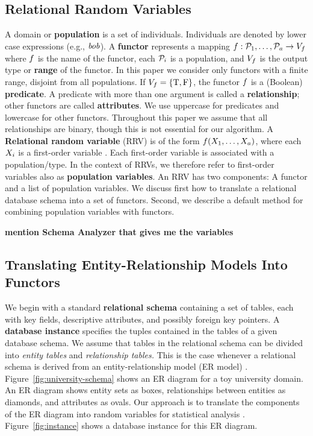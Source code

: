\documentclass{acm_proc_article-sp}
\begin{document}
\subsection{Relational Random Variables}
A domain or \textbf{population} is a set of individuals.
Individuals are denoted by lower case expressions (e.g., $\it{bob}$). 
A \textbf{functor} represents a mapping
$f: \mathcal{P}_{1},\ldots,\mathcal{P}_{a} \rightarrow V_{f}$
where $f$ is the name of the functor, each $\mathcal{P}_{i}$ is a population, and $V_{f}$ is the output type or \textbf{range} of the functor. 
In this paper we consider only functors with a finite range, disjoint from all populations.  If $V_{f} = \{\mathrm{T},\mathrm{F}\}$, the functor $f$ is a (Boolean) \textbf{predicate}. A predicate with more than one argument is called a \textbf{relationship}; other functors are called \textbf{attributes}. We use uppercase for predicates and lowercase for other functors. Throughout this paper we assume that all relationships are binary, though this is not essential for our algorithm.
%
A \textbf{Relational random variable} (RRV) is of the form $f(X_{1},\ldots,X_{a})$, where each $X_{i}$ is a first-order variable \cite{Poole2003}. 
Each first-order variable is associated with a population/type. In the context of RRVs, we therefore refer to first-order variables also as \textbf{population variables}. An RRV has two components: A functor and a list of population variables. We discuss first how to translate a relational database schema into a set of functors. Second, we describe a default method for combining population variables with functors. 

\textbf{mention Schema Analyzer that gives me the variables}

\subsection{Translating Entity-Relationship Models Into Functors}
 We begin with a standard \textbf{relational schema} containing a set of tables, each with key fields, %
descriptive attributes, and possibly foreign key pointers. 
A \textbf{database instance} specifies the tuples contained in the tables of a given database schema. 
We assume that tables in the relational schema can be divided into {\em entity tables} and {\em relationship tables.} 
This is the case whenever a relational schema is derived from an entity-relationship model (ER model) \cite[Ch.2.2]{Ullman1982}. Figure~\ref{fig:university-schema} shows an ER diagram for a toy university domain. An ER diagram shows entity sets as boxes, relationships between entities as diamonds, and attributes as ovals. Our approach is to translate the components of the ER diagram into random variables for statistical analysis \cite{Heckerman+al:SRL07}. Figure~\ref{fig:instance} shows a database instance for this ER diagram.
\end{document}
